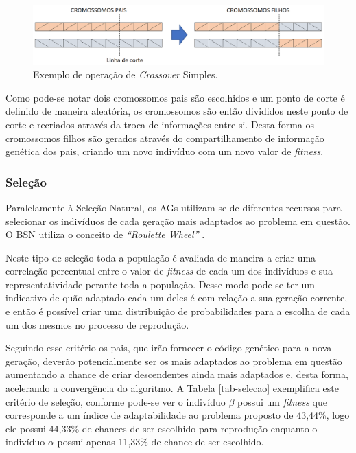 \begin{figure} [!htb]%
	\centering
	\includegraphics[width=1\textwidth]{./figuras/crossover.png}
	\caption[Exemplo de \emph{Crossover}]{Exemplo de operação de \emph{Crossover} Simples.}
	\label{fig_crossover}
\end{figure}

Como pode-se notar dois cromossomos pais são escolhidos e um ponto de corte é definido de maneira aleatória, os cromossomos são então divididos neste ponto de corte e recriados através da troca de informações entre si. Desta forma os cromossomos filhos são gerados através do compartilhamento de informação genética dos pais, criando um novo indivíduo com um novo valor de \emph{fitness}.

\subsubsection{Seleção}
Paralelamente à Seleção Natural, os AGs utilizam-se de diferentes recursos para selecionar os indivíduos de cada geração mais adaptados ao problema em questão. O BSN utiliza o conceito de \emph{``Roulette Wheel''} \cite{Goldberg1889}. 

Neste tipo de seleção toda a população é avaliada de maneira a criar uma correlação percentual entre o valor de \emph{fitness} de cada um dos indivíduos e sua representatividade perante toda a população. Desse modo pode-se ter um indicativo de quão adaptado cada um deles é com relação a sua geração corrente, e então é possível criar uma distribuição de probabilidades para a escolha de cada um dos mesmos no processo de reprodução.

Seguindo esse critério os pais, que irão fornecer o código genético para a nova geração, deverão potencialmente ser os mais adaptados ao problema em questão aumentando a chance de criar descendentes ainda mais adaptados e, desta forma, acelerando a convergência do algoritmo. A Tabela \ref{tab-selecao} exemplifica este critério de seleção, conforme pode-se ver o indivíduo $\beta$ possui um \emph{fitness} que corresponde a um índice de adaptabilidade ao problema proposto de 43,44\%, logo ele possui 44,33\% de chances de ser escolhido para reprodução enquanto o indivíduo $\alpha$ possui apenas 11,33\% de chance de ser escolhido.

